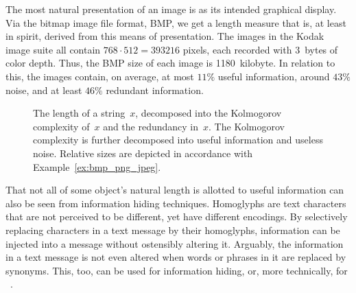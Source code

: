 \begin{example}[continued]
\label{ex:bmp_png_jpeg}%
  The most natural presentation of an image is as its intended graphical display.
  Via the bitmap image file format, BMP, we get a length measure that is, at least in spirit, derived from this means of presentation.
  The images in the Kodak image suite all contain $768 \cdot 512 = 393216$ pixels, each recorded with $3$~bytes of color depth.
  Thus, the BMP size of each image is 1180~kilobyte.
  In relation to this, the images contain, on average, at most $11\%$ useful information, around $43\%$ noise, and at least $46\%$ redundant information.
\end{example}

\begin{figure}
  \centering
  \caption{
    The length of a string~$x$, decomposed into the Kolmogorov complexity of~$x$ and the redundancy in~$x$.
    The Kolmogorov complexity is further decomposed into useful information and useless noise.
    Relative sizes are depicted in accordance with Example~\ref{ex:bmp_png_jpeg}.
  }
  \label{fig:length_decomposed}
\end{figure}

That not all of some object's natural length is allotted to useful information can also be seen from information hiding techniques.
Homoglyphs are text characters that are not perceived to be different, yet have different encodings.
By selectively replacing characters in a text message by their homoglyphs, information can be injected into a message without ostensibly altering it.
Arguably, the information in a text message is not even altered when words or phrases in it are replaced by synonyms.
This, too, can be used for information hiding, or, more technically, for ~\parencite{hosmani2015dual}.

